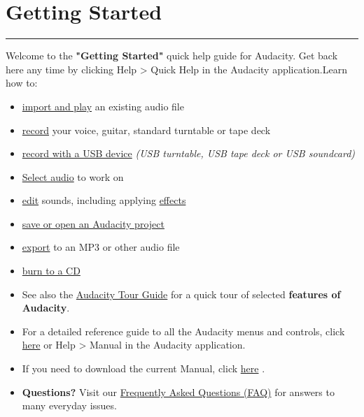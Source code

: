 
\ensurespace\section{Getting Started}
\par\vspace{1mm}\hrule
\begin{multicols}{2}\label{quick:help:}\par Welcome to the \textbf{"Getting Started"} quick help guide for Audacity. Get back here any time by clicking Help > Quick Help in the Audacity application.Learn how to:

\begin{itemize}
\item 
\hyperref[\foo{man:play:}]{ import and play}
 an existing audio file 
\item 
\hyperref[\foo{man:record:}]{ record}
 your voice, guitar, standard turntable or tape deck
\item 
\hyperref[\foo{man:usb:recording:}]{ record with a USB device}
\textit{(USB turntable, USB tape deck or USB soundcard)}
\item 
\hyperref[\foo{man:selecting:audio:the:basics:}]{Select audio}
 to work on
\item 
\hyperref[\foo{man:edit:}]{ edit}
 sounds, including applying 
\hyperref[\foo{man:effect:menu:}]{effects}

\item 
\hyperref[\foo{man:saving:}]{ save or open an Audacity project}

\item 
\hyperref[\foo{man:export:}]{ export}
 to an MP3 or other audio file
\item 
\hyperref[\foo{man:burncd:}]{ burn to a CD}

\end{itemize}

\begin{itemize}
\item  See also the 
\hyperref[\foo{man:audacity:tour:guide:}]{Audacity Tour Guide}
 for a quick tour of selected \textbf{features of Audacity}. 
\item  For a detailed reference guide to all the Audacity menus and controls, click 
\hyperref[\foo{index:reference}]{here}
 or Help > Manual in the Audacity application. 
\item  If you need to download the current Manual, click 
\hyperref[\foo{man:unzipping:the:manual:}]{here}
.
\item \textbf{Questions?} Visit our 
\hyperref[\foo{man:faq:}]{Frequently Asked Questions (FAQ)}
 for answers to many everyday issues.  
\end{itemize}
\end{multicols}